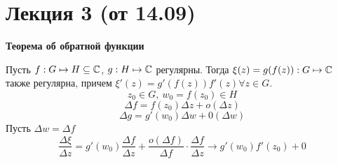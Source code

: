 \section{Лекция 3 (от 14.09)}
\begin{center}
    \textbf{Теорема об обратной функции}
\end{center}
\theorem
Пусть $f: G \mapsto H \subseteq \mathbb{C}$, $g: H \mapsto \mathbb{C}$ регулярны.
Тогда $\xi(z) = g(f(z)): G \mapsto \mathbb{C}$ также регулярна, причем $\xi'(z) =
g'(f(z))f'(z) \forall z \in G$.
\pr
$$z_0 \in G, \ w_0 = f(z_0) \in H$$
$$\Delta f = f(z_0)\Delta z + o(\Delta z)$$
$$\Delta g = g'(w_0) \Delta w + 0(\Delta w)$$
Пусть $\Delta w = \Delta f$
$$\frac{\Delta \xi}{\Delta z} = g'(w_0) \frac{\Delta f}{\Delta z} +
\frac{o(\Delta f)}{\Delta f} \cdot \frac{\Delta f}{\Delta z} \rightarrow
g'(w_0)f'(z_0) + 0$$